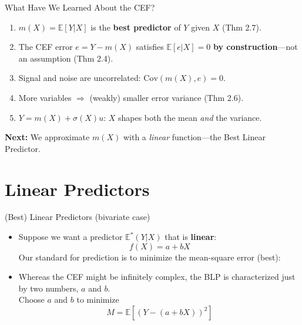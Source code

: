 \documentclass[aspectratio=169, handout, t]{beamer}
\numberwithin{equation}{section}
\begin{document}
\begin{frame}{What Have We Learned About the CEF?}
\begin{tcolorbox}[colback=blue!5, colframe=blue!50, title=CEF Summary]
\begin{enumerate}
\item $m(X)=\mathbb{E}[Y|X]$ is the \textbf{best predictor} of $Y$ given $X$ (Thm 2.7).
\item The CEF error $e=Y-m(X)$ satisfies $\mathbb{E}[e|X]=0$ \textbf{by construction}---not an assumption (Thm 2.4).
\item Signal and noise are uncorrelated: $\text{Cov}(m(X), e)=0$.
\item More variables $\Rightarrow$ (weakly) smaller error variance (Thm 2.6).
\item $Y = m(X) + \sigma(X)u$: $X$ shapes both the mean \emph{and} the variance.
\end{enumerate}
\end{tcolorbox}
\medskip
\textbf{Next:} We approximate $m(X)$ with a \emph{linear} function---the Best Linear Predictor.
\end{frame}

\section{Linear Predictors}

\begin{frame}{(Best) Linear Predictors (bivariate case)}

\begin{itemize}
\item Suppose we want a predictor $ \mathbb{E}^{*}(Y|X)$ that is \textbf{linear}:
$$f(X)=a+bX$$\pause
Our standard for prediction is to minimize the mean-square error (best): \\
\item Whereas the CEF might be infinitely complex, the BLP is characterized just by two numbers, $a$ and $b$.\\
\pause
Choose $a$ and $b$ to minimize
$$M= \mathbb{E}[(Y-(a+bX))^2]$$
\end{itemize}
\end{frame}
\end{document}
